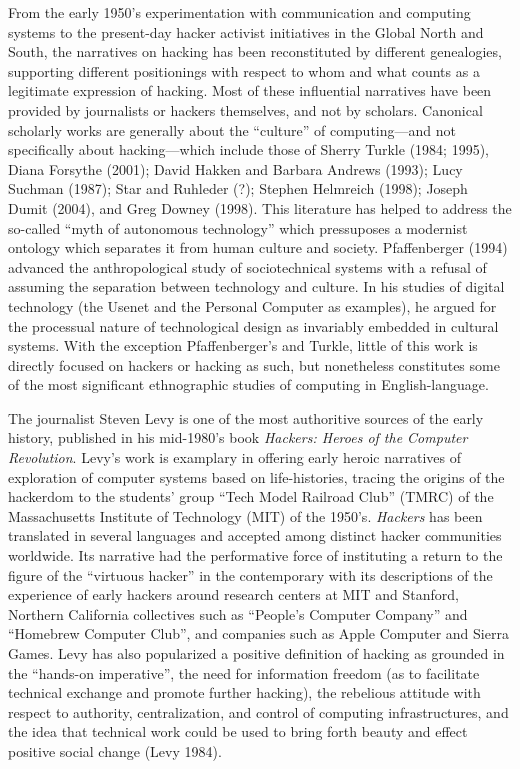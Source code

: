 \documentclass[10pt,letter,oneside]{scrartcl}
\begin{document}
From the early 1950's experimentation with communication and computing systems
to the present-day hacker activist initiatives in the Global North and South,
the narratives on hacking has been reconstituted by different genealogies,
supporting different positionings with respect to whom and what counts as a
legitimate expression of hacking.  Most of these influential narratives have
been provided by journalists or hackers themselves, and not by scholars.  
Canonical scholarly works are generally about the ``culture'' of computing---and 
not specifically about hacking---which include those of Sherry Turkle (1984; 1995), 
Diana Forsythe (2001); David Hakken and Barbara Andrews (1993); Lucy Suchman (1987); 
Star and Ruhleder (?); Stephen Helmreich (1998); Joseph Dumit (2004), and Greg Downey 
(1998). This literature has helped to address the so-called ``myth of autonomous
technology'' which pressuposes a modernist ontology which separates it from
human culture and society. Pfaffenberger (1994) advanced the anthropological 
study of sociotechnical systems with a refusal of assuming the separation between
technology and culture. In his studies of digital technology (the Usenet and the
Personal Computer as examples), he argued for the processual nature of
technological design as invariably embedded in cultural systems. With the exception
Pfaffenberger's and Turkle, little of this work is directly focused on hackers 
or hacking as such, but nonetheless constitutes some of the most significant 
ethnographic studies of computing in English-language.

The journalist Steven Levy is one of the most authoritive sources of the early
history, published in his mid-1980's book \emph{Hackers: Heroes of the Computer 
Revolution}.  Levy's work is examplary in offering early heroic narratives of 
exploration of computer systems based on life-histories, tracing the origins 
of the hackerdom to the students' group ``Tech Model Railroad Club'' (TMRC) of 
the Massachusetts Institute of Technology (MIT) of the 1950's. \emph{Hackers} 
has been translated in several languages and accepted among distinct hacker 
communities worldwide. Its narrative had the performative force of 
instituting a return to the figure of the ``virtuous hacker'' in the contemporary 
with its descriptions of the experience of early hackers around research centers 
at MIT and Stanford, Northern California collectives such as ``People's Computer
Company'' and ``Homebrew Computer Club'', and companies such as Apple Computer 
and Sierra Games. Levy has also popularized a positive definition of hacking as 
grounded in the ``hands-on imperative'', the need for information freedom (as to facilitate technical exchange and promote further hacking), the rebelious 
attitude with respect to authority, centralization, and control of 
computing infrastructures, and the idea that technical work could be used to 
bring forth beauty and effect positive social change (Levy 1984).
\end{document}
